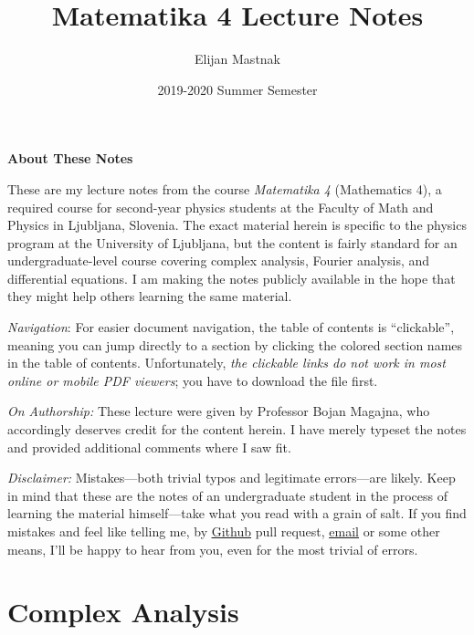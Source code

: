 \documentclass[11pt, a4paper]{article}
\begin{document}
\title{Matematika 4 Lecture Notes}
\author{Elijan Mastnak}
\date{2019-2020 Summer Semester}
\maketitle

\begin{center}
\textbf{About These Notes}
\end{center}
These are my lecture notes from the course \textit{Matematika 4} (Mathematics 4), a required course for second-year physics students at the Faculty of Math and Physics in Ljubljana, Slovenia. The exact material herein is specific to the physics program at the University of Ljubljana, but the content is fairly standard for an undergraduate-level course covering complex analysis, Fourier analysis, and differential equations. I am making the notes publicly available in the hope that they might help others learning the same material.

\vspace{2mm}
\textit{Navigation}: For easier document navigation, the table of contents is ``clickable'', meaning you can jump directly to a section by clicking the colored section names in the table of contents. Unfortunately, \textit{the clickable links do not work in most online or mobile PDF viewers}; you have to download the file first.


\vspace{2mm}
\textit{On Authorship:} These lecture were given by Professor Bojan Magajna, who accordingly deserves credit for the content herein. I have merely typeset the notes and provided additional comments where I saw fit.

\vspace{2mm}
\textit{Disclaimer:} Mistakes---both trivial typos and legitimate errors---are likely. Keep in mind that these are the notes of an undergraduate student in the process of learning the material himself---take what you read with a grain of salt. If you find mistakes and feel like telling me, by \href{https://github.com/ejmastnak/fmf}{\underline{Github}} pull request, \href{mailto:ejmastnak@gmail.com}{\underline{email}} or some other means, I'll be happy to hear from you, even for the most trivial of errors.



\tableofcontents

\newpage

\section{Complex Analysis}
\end{document}
